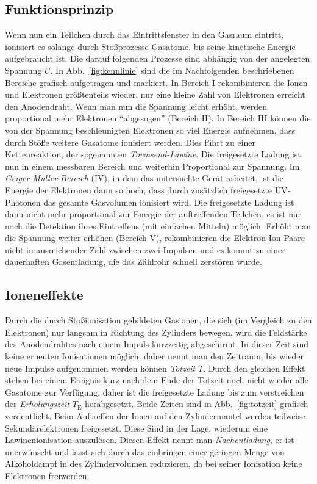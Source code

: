 \subsection{Funktionsprinzip}
Wenn nun ein Teilchen durch das Eintrittsfenster in den Gasraum eintritt, ionisiert es solange durch Stoßprozesse Gasatome, bis seine kinetische Energie aufgebraucht ist. Die darauf folgenden Prozesse sind abhängig von der angelegten Spannung $U$. In Abb.~\ref{fig:kennlinie} sind die im Nachfolgenden beschriebenen Bereiche grafisch aufgetragen und markiert. In Bereich I rekombinieren die Ionen und Elektronen größtenteils wieder, nur eine kleine Zahl von Elektronen erreicht den Anodendraht. Wenn man nun die Spannung leicht erhöht, werden proportional mehr Elektronen \enquote{abgesogen} (Bereich II). In Bereich III können die von der Spannung beschleunigten Elektronen so viel Energie aufnehmen, dass durch Stöße weitere Gasatome ionisiert werden. Dies führt zu einer Kettenreaktion, der sogenannten \emph{Townsend-Lawine}. Die freigesetzte Ladung ist nun in einem messbaren Bereich und weiterhin Proportional zur Spannung. Im \emph{Geiger-Müller-Bereich} (IV), in dem das untersuchte Gerät arbeitet, ist die Energie der Elektronen dann so hoch, dass durch zusätzlich freigesetzte UV-Photonen das gesamte Gasvolumen ionisiert wird. Die freigesetzte Ladung ist dann nicht mehr proportional zur Energie der auftreffenden Teilchen, es ist nur noch die Detektion ihres Eintreffens (mit einfachen Mitteln) möglich. Erhöht man die Spannung weiter erhöhen (Bereich V), rekombinieren die Elektron-Ion-Paare nicht in ausreichender Zahl zwischen zwei Impulsen und es kommt zu einer dauerhaften Gasentladung, die das Zählrohr schnell zerstören wurde.

\subsection{Ioneneffekte}
Durch die durch Stoßionisation gebildeten Gasionen, die sich (im Vergleich zu den Elektronen) nur langsam in Richtung des Zylinders bewegen, wird die Feldstärke des Anodendrahtes nach einem Impuls kurzzeitig abgeschirmt. In dieser Zeit sind keine erneuten Ionisationen möglich, daher nennt man den Zeitraum, bis wieder neue Impulse aufgenommen werden können \emph{Totzeit} $T$. Durch den gleichen Effekt stehen bei einem Ereignis kurz nach dem Ende der Totzeit noch nicht wieder alle Gasatome zur Verfügung, daher ist die freigesetzte Ladung bis zum verstreichen der \emph{Erholungszeit} $T_\text{E}$ herabgesetzt. Beide Zeiten sind in Abb.~\ref{fig:totzeit} grafisch verdeutlicht.
Beim Auftreffen der Ionen auf den Zylindermantel werden teilweise Sekundärelektronen freigesetzt. Diese Sind in der Lage, wiederum eine Lawinenionisation auszulösen. Diesen Effekt nennt man \emph{Nachentladung}, er ist unerwünscht und lässt sich durch das einbringen einer geringen Menge von Alkoholdampf in des Zylindervolumen reduzieren, da bei seiner Ionisation keine Elektronen freiwerden.

